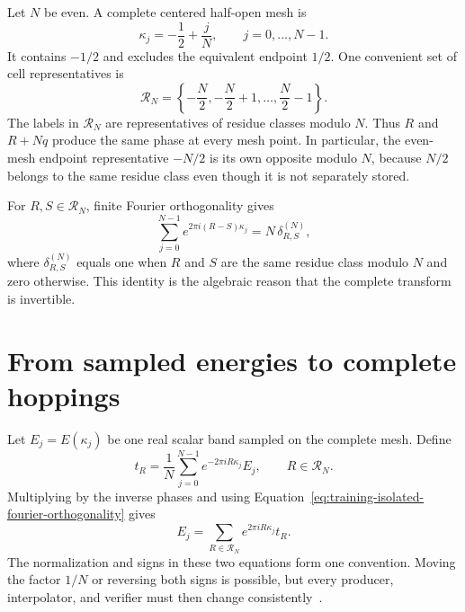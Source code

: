 Let $N$ be even. A complete centered half-open mesh is
\begin{equation}
  \kappa_j=-\frac12+\frac{j}{N},
  \qquad j=0,\ldots,N-1.
  \label{eq:training-isolated-centered-mesh}
\end{equation}
It contains $-1/2$ and excludes the equivalent endpoint $1/2$. One convenient
set of cell representatives is
\begin{equation}
  \mathcal R_N
  =\left\{-\frac N2,-\frac N2+1,\ldots,\frac N2-1\right\}.
  \label{eq:training-isolated-representatives}
\end{equation}
The labels in $\mathcal R_N$ are representatives of residue classes modulo
$N$. Thus $R$ and $R+Nq$ produce the same phase at every mesh point. In
particular, the even-mesh endpoint representative $-N/2$ is its own opposite
modulo $N$, because $N/2$ belongs to the same residue class even though it is
not separately stored.

For $R,S\in\mathcal R_N$, finite Fourier orthogonality gives
\begin{equation}
  \sum_{j=0}^{N-1}
  e^{2\pi i(R-S)\kappa_j}
  =N\,\delta_{R,S}^{(N)},
  \label{eq:training-isolated-fourier-orthogonality}
\end{equation}
where $\delta_{R,S}^{(N)}$ equals one when $R$ and $S$ are the same residue
class modulo $N$ and zero otherwise. This identity is the algebraic reason that
the complete transform is invertible.

\section{From sampled energies to complete hoppings}

Let $E_j=E(\kappa_j)$ be one real scalar band sampled on the complete mesh.
Define
\begin{equation}
  t_R
  =\frac1N\sum_{j=0}^{N-1}
    e^{-2\pi iR\kappa_j}E_j,
  \qquad R\in\mathcal R_N.
  \label{eq:training-isolated-forward-transform}
\end{equation}
Multiplying by the inverse phases and using
Equation~\eqref{eq:training-isolated-fourier-orthogonality} gives
\begin{equation}
  E_j
  =\sum_{R\in\mathcal R_N}
    e^{2\pi iR\kappa_j}t_R.
  \label{eq:training-isolated-inverse-transform}
\end{equation}
The normalization and signs in these two equations form one convention. Moving
the factor $1/N$ or reversing both signs is possible, but every producer,
interpolator, and verifier must then change consistently~\cite{trefethen2000}.

